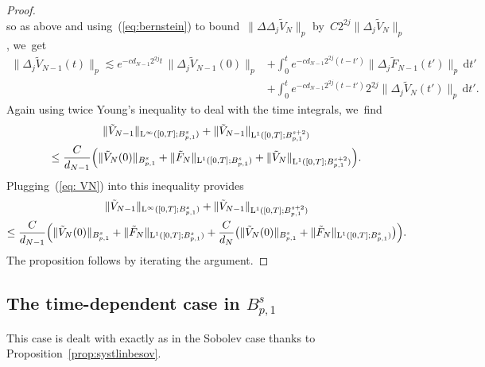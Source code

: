 \documentclass[10pt]{amsart}
\theoremstyle{definition}
\newcommand\dd{\mathrm{d}}
\renewcommand\L{\mathrm{L}}
\begin{document}
\begin{proof}
\[\]
so as above and using~(\ref{eq:bernstein}) to bound~$\|\Delta \Delta_j \tilde V_{N } \|_p$ by~$C 2^{2j}\| \Delta_j \tilde V_{N } \|_p$, we~get\vspace*{-3pt}
\[
\begin{aligned}
\| \Delta_j \tilde V_{N-1}(t)\|_p \lesssim e^{- cd_{N-1}2^{2j}t }\,\| \Delta_j \tilde V_{N-1}(0)\|_p & + \int_0^t e^{- cd_{N-1}2^{2j}(t-t') }\| \Delta_j\tilde F_{N-1}(t')\|_p \, \dd t' \\
& + \int_0^t e^{- cd_{N-1}2^{2j}(t-t') } 2^{2j}\| \Delta_j \tilde V_{N } (t')\|_p \,\dd t'.
\end{aligned}
\]
Again using twice Young's inequality to deal with the time integrals, we~find\vspace*{-3pt}
\begin{multline*}
\| \tilde V_{N-1 } \|_{\L^\infty([0,T];B^s_{p,1})} + \| \tilde V_{N-1 }\|_{\L^1([0,T];B^{s+2}_{p,1})} \\
\leq \frac C {d_{N-1}} \Bigl(\| \tilde V_N (0)\|_{B^s_{p,1}} + \| \tilde F_N \|_{\L^1([0,T];B^s_{p,1})}
+ \| \tilde V_{N } \|_{\L^1([0,T];B^{s+2}_{p,1})} \Bigr).
\end{multline*}
Plugging~(\ref{eq: VN}) into this inequality provides
\begin{multline*}
\| \tilde V_{N-1 } \|_{\L^\infty([0,T];B^s_{p,1})} + \| \tilde V_{N-1 }\|_{\L^1([0,T];B^{s+2}_{p,1})}\\
\leq \frac C {d_{N-1}} \Bigl(\| \tilde V_N (0)\|_{B^s_{p,1}} + \| \tilde F_N \|_{\L^1([0,T];B^s_{p,1})} + \frac C {d_N} \bigl(\| \tilde V_N (0)\|_{B^s_{p,1}} + \| \tilde F_N \|_{\L^1([0,T];B^s_{p,1})} \bigr) \Bigr).
\end{multline*}
The proposition follows by iterating the argument.
\end{proof}
\subsection{The time-dependent case in $B^s_{p,1}$}
This
case is dealt with exactly as in the Sobolev case thanks to Proposition~\ref{prop:systlinbesov}.

\end{document}
